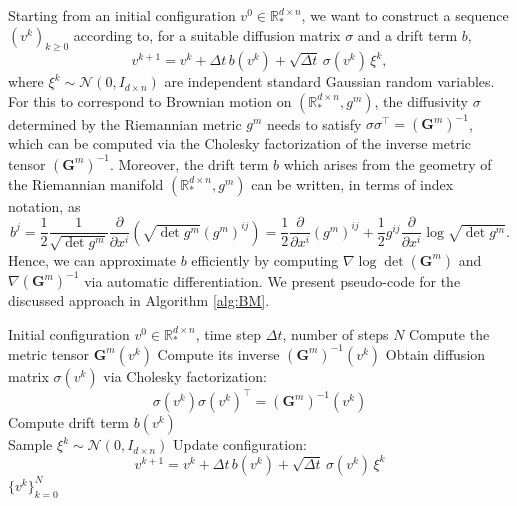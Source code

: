 \documentclass[11pt]{article}
\begin{document}
Starting from an initial configuration $v^0 \in \mathbb{R}_*^{d\times n}$, we want to construct a sequence $(v^k)_{k\ge0}$ according to, for a suitable diffusion matrix $\sigma$ and a drift term $b$,
\begin{displaymath}
    v^{k+1} = v^k + \Delta t\, b(v^k) + \sqrt{\Delta t}\,\sigma(v^k)\,\xi^k,
\end{displaymath}
where $\xi^k \sim \mathcal{N}(0,I_{d\times n})$ are independent standard Gaussian random variables. For this to correspond to Brownian motion on $(\mathbb{R}_*^{d\times n},g^m)$, the diffusivity $\sigma$ determined by the Riemannian metric $g^m$ needs to satisfy $\sigma\sigma^\top=(\mathbf{G}^m)^{-1}$, which can be computed via the Cholesky factorization of the inverse metric tensor $(\mathbf{G}^m)^{-1}$. Moreover, the drift term $b$ which arises from the geometry of the Riemannian manifold $(\mathbb{R}_*^{d\times n},g^m)$ can be written, in terms of index notation, as
\begin{displaymath}
    b^j=\frac{1}{2}\frac{1}{\sqrt{\det g^m}}\frac{\partial}{\partial x^i}
    \left(\sqrt{\det g^m} (g^m)^{ij}\right)= \frac{1}{2}\frac{\partial}{\partial x^i}(g^m)^{ij}+\frac{1}{2}g^{ij}\frac{\partial}{\partial x^i}\log\sqrt{\det g^m}.
\end{displaymath}
Hence, we can approximate $b$ efficiently by computing $\nabla \log\det(\mathbf{G}^m)$ and $\nabla (\mathbf{G}^m)^{-1}$ via automatic differentiation. We present pseudo-code for the discussed approach in Algorithm \ref{alg:BM}.

\begin{algorithm}[H]
\caption{Simulation of Brownian Motion on $(\mathbb{R}_*^{d\times n}, g^m)$ via Euler--Maruyama Scheme}\label{alg:BM}
\begin{algorithmic}[1]
\Require Initial configuration $v^0 \in \mathbb{R}_*^{d\times n}$, time step $\Delta t$, number of steps $N$
    \State Compute the metric tensor $\mathbf{G}^m(v^k)$
    \State Compute its inverse $(\mathbf{G}^m)^{-1}(v^k)$
    \State Obtain diffusion matrix $\sigma(v^k)$ via Cholesky factorization:
        \[
        \sigma(v^k)\sigma(v^k)^\top = (\mathbf{G}^m)^{-1}(v^k)
        \]
    \State Compute drift term $b(v^k)$\\
    \State Sample $\xi^k \sim \mathcal{N}(0, I_{d\times n})$
    \State Update configuration:
        \[
        v^{k+1} = v^k + \Delta t\, b(v^k) + \sqrt{\Delta t}\, \sigma(v^k)\, \xi^k
        \]
\EndFor
\State \Return $\{v^k\}_{k=0}^{N}$
\end{algorithmic}
\end{algorithm}
\end{document}
